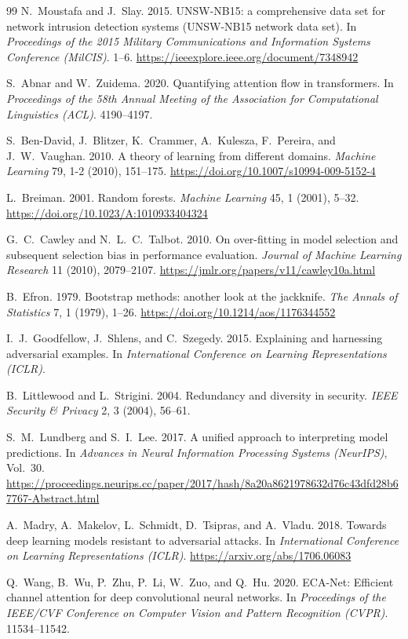 \documentclass[sigconf]{acmart}
\begin{document}
\begin{thebibliography}{99}
N.\ Moustafa and J.\ Slay. 2015. UNSW-NB15: a comprehensive data set for network intrusion detection systems (UNSW-NB15 network data set). In \textit{Proceedings of the 2015 Military Communications and Information Systems Conference (MilCIS)}. 1--6. \url{https://ieeexplore.ieee.org/document/7348942}

S.\ Abnar and W.\ Zuidema. 2020. Quantifying attention flow in transformers. In \textit{Proceedings of the 58th Annual Meeting of the Association for Computational Linguistics (ACL)}. 4190--4197.

S.\ Ben-David, J.\ Blitzer, K.\ Crammer, A.\ Kulesza, F.\ Pereira, and J.\ W.\ Vaughan. 2010. A theory of learning from different domains. \textit{Machine Learning} 79, 1-2 (2010), 151--175. \url{https://doi.org/10.1007/s10994-009-5152-4}

L.\ Breiman. 2001. Random forests. \textit{Machine Learning} 45, 1 (2001), 5--32. \url{https://doi.org/10.1023/A:1010933404324}

G.\ C.\ Cawley and N.\ L.\ C.\ Talbot. 2010. On over-fitting in model selection and subsequent selection bias in performance evaluation. \textit{Journal of Machine Learning Research} 11 (2010), 2079--2107. \url{https://jmlr.org/papers/v11/cawley10a.html}

B.\ Efron. 1979. Bootstrap methods: another look at the jackknife. \textit{The Annals of Statistics} 7, 1 (1979), 1--26. \url{https://doi.org/10.1214/aos/1176344552}

I.\ J.\ Goodfellow, J.\ Shlens, and C.\ Szegedy. 2015. Explaining and harnessing adversarial examples. In \textit{International Conference on Learning Representations (ICLR)}.

B.\ Littlewood and L.\ Strigini. 2004. Redundancy and diversity in security. \textit{IEEE Security \& Privacy} 2, 3 (2004), 56--61.

S.\ M.\ Lundberg and S.\ I.\ Lee. 2017. A unified approach to interpreting model predictions. In \textit{Advances in Neural Information Processing Systems (NeurIPS)}, Vol.\ 30. \url{https://proceedings.neurips.cc/paper/2017/hash/8a20a8621978632d76c43dfd28b67767-Abstract.html}

A.\ Madry, A.\ Makelov, L.\ Schmidt, D.\ Tsipras, and A.\ Vladu. 2018. Towards deep learning models resistant to adversarial attacks. In \textit{International Conference on Learning Representations (ICLR)}. \url{https://arxiv.org/abs/1706.06083}

Q.\ Wang, B.\ Wu, P.\ Zhu, P.\ Li, W.\ Zuo, and Q.\ Hu. 2020. ECA-Net: Efficient channel attention for deep convolutional neural networks. In \textit{Proceedings of the IEEE/CVF Conference on Computer Vision and Pattern Recognition (CVPR)}. 11534--11542.

\end{thebibliography}
\end{document}
